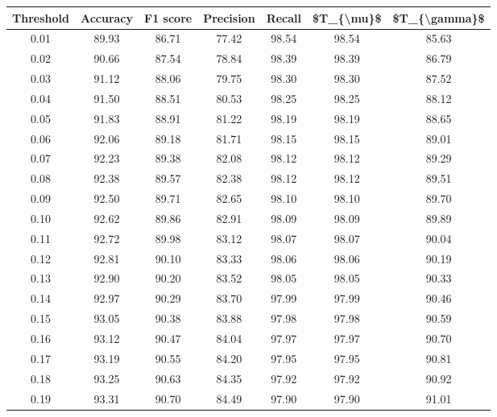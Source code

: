 \begin{tabular}{|c|c|c|c|c|c|c|}
\hline
 Threshold &  Accuracy &  F1 score &  Precision &  Recall &  \$T\_\{\textbackslash mu\}\$ &  \$T\_\{\textbackslash gamma\}\$ \\
\hline
      0.01 &     89.93 &     86.71 &      77.42 &   98.54 &      98.54 &         85.63 \\
      0.02 &     90.66 &     87.54 &      78.84 &   98.39 &      98.39 &         86.79 \\
      0.03 &     91.12 &     88.06 &      79.75 &   98.30 &      98.30 &         87.52 \\
      0.04 &     91.50 &     88.51 &      80.53 &   98.25 &      98.25 &         88.12 \\
      0.05 &     91.83 &     88.91 &      81.22 &   98.19 &      98.19 &         88.65 \\
      0.06 &     92.06 &     89.18 &      81.71 &   98.15 &      98.15 &         89.01 \\
      0.07 &     92.23 &     89.38 &      82.08 &   98.12 &      98.12 &         89.29 \\
      0.08 &     92.38 &     89.57 &      82.38 &   98.12 &      98.12 &         89.51 \\
      0.09 &     92.50 &     89.71 &      82.65 &   98.10 &      98.10 &         89.70 \\
      0.10 &     92.62 &     89.86 &      82.91 &   98.09 &      98.09 &         89.89 \\
      0.11 &     92.72 &     89.98 &      83.12 &   98.07 &      98.07 &         90.04 \\
      0.12 &     92.81 &     90.10 &      83.33 &   98.06 &      98.06 &         90.19 \\
      0.13 &     92.90 &     90.20 &      83.52 &   98.05 &      98.05 &         90.33 \\
      0.14 &     92.97 &     90.29 &      83.70 &   97.99 &      97.99 &         90.46 \\
      0.15 &     93.05 &     90.38 &      83.88 &   97.98 &      97.98 &         90.59 \\
      0.16 &     93.12 &     90.47 &      84.04 &   97.97 &      97.97 &         90.70 \\
      0.17 &     93.19 &     90.55 &      84.20 &   97.95 &      97.95 &         90.81 \\
      0.18 &     93.25 &     90.63 &      84.35 &   97.92 &      97.92 &         90.92 \\
      0.19 &     93.31 &     90.70 &      84.49 &   97.90 &      97.90 &         91.01 \\

\end{tabular}
